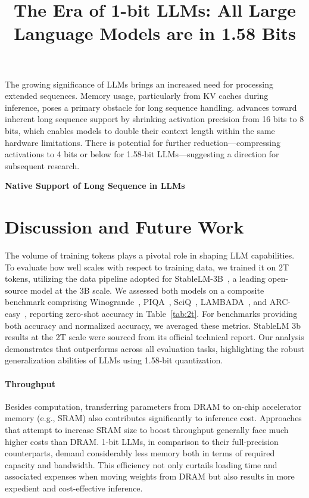 \title{The Era of 1-bit LLMs: All Large Language Models are in 1.58 Bits}
The growing significance of LLMs brings an increased need for processing extended sequences. Memory usage, particularly from KV caches during inference, poses a primary obstacle for long sequence handling.  advances toward inherent long sequence support by shrinking activation precision from 16 bits to 8 bits, which enables models to double their context length within the same hardware limitations. There is potential for further reduction—compressing activations to 4 bits or below for 1.58-bit LLMs—suggesting a direction for subsequent research.

\textbf{Native Support of Long Sequence in LLMs}

\section{Discussion and Future Work}



The volume of training tokens plays a pivotal role in shaping LLM capabilities. To evaluate how well  scales with respect to training data, we trained it on 2T tokens, utilizing the data pipeline adopted for StableLM-3B~\cite{StableLM-3B-4E1T}, a leading open-source model at the 3B scale. We assessed both models on a composite benchmark comprising Winogrande~\cite{winoGrande}, PIQA~\cite{piqa}, SciQ~\cite{sciq}, LAMBADA~\cite{lambada}, and ARC-easy~\cite{arc}, reporting zero-shot accuracy in Table~\ref{tab:2t}. For benchmarks providing both accuracy and normalized accuracy, we averaged these metrics. StableLM 3b results at the 2T scale were sourced from its official technical report. Our analysis demonstrates that  outperforms across all evaluation tasks, highlighting the robust generalization abilities of LLMs using 1.58-bit quantization.

\paragraph{Throughput}

Besides computation, transferring parameters from DRAM to on-chip accelerator memory (e.g., SRAM) also contributes significantly to inference cost. Approaches that attempt to increase SRAM size to boost throughput generally face much higher costs than DRAM. 1-bit LLMs, in comparison to their full-precision counterparts, demand considerably less memory both in terms of required capacity and bandwidth. This efficiency not only curtails loading time and associated expenses when moving weights from DRAM but also results in more expedient and cost-effective inference.

